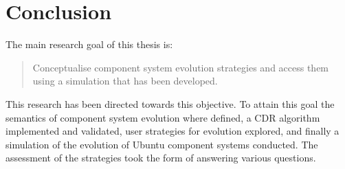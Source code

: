 \chapter{Conclusion}
\label{conclusion}
The main research goal of this thesis is:
\begin{quote}
Conceptualise component system evolution strategies and access them using a simulation that has been developed.
\end{quote}
This research has been directed towards this objective.
To attain this goal the semantics of component system evolution where defined, a CDR algorithm implemented and validated, user strategies for evolution explored,
and finally a simulation of the evolution of Ubuntu component systems conducted.
The assessment of the strategies took the form of answering various questions.


